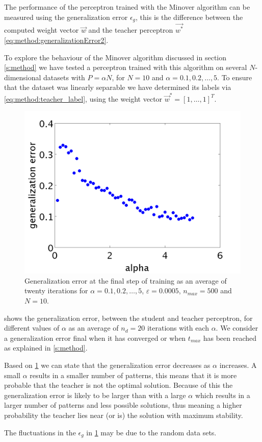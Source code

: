 The performance of the perceptron trained with the Minover algorithm can be measured using the generalization error $\epsilon_g$, this is the difference between the computed weight vector $\vec{w}$ and the teacher perceptron $\vec{w^*}$ \eqref{eq:method:generalizationError2}. 

To explore the behaviour of the Minover algorithm discussed in section \ref{s:method} we have tested a perceptron trained with this algorithm on several $N$-dimensional datasets with $P = \alpha N$, for $N = 10$ and $\alpha = 0.1, 0.2, \dotsc, 5$. To ensure that the dataset was linearly separable we have determined its labels via \eqref{eq:method:teacher_label}, using the weight vector $\vec{w}^* = [1, \dotsc, 1]^T$.\\

\begin{figure}[t]
	\centering
	\includegraphics[width=0.9\columnwidth]{./img/finalgeneralizationerrors}
	\caption{Generalization error at the final step of training as an average of twenty iterations for $\alpha = 0.1, 0.2, \dotsc, 5$, $\varepsilon = 0.0005$, $n_{max} = 500$ and $N = 10$.}
	\label{fig:exp:finalgeneralizationError}
\end{figure}

 shows the generalization error, between the student and teacher perceptron, for different values of $\alpha$ as an average of $n_d = 20$ iterations with each $\alpha$. We consider a generalization error final when it has converged or when $t_{max}$ has been reached as explained in \cref{s:method}. 

Based on \cref{fig:exp:finalgeneralizationError} we can state that the generalization error decreases as $\alpha$ increases. A small $\alpha$ results in a smaller number of patterns, this means that it is more probable that the teacher is not the optimal solution. Because of this the generalization error is likely to be larger than with a large $\alpha$ which results in a larger number of patterns and less possible solutions, thus meaning a higher probability the teacher lies near (or is) the solution with maximum stability.

The fluctuations in the $\epsilon_g$ in \cref{fig:exp:finalgeneralizationError} may be due to the random data sets.\\
